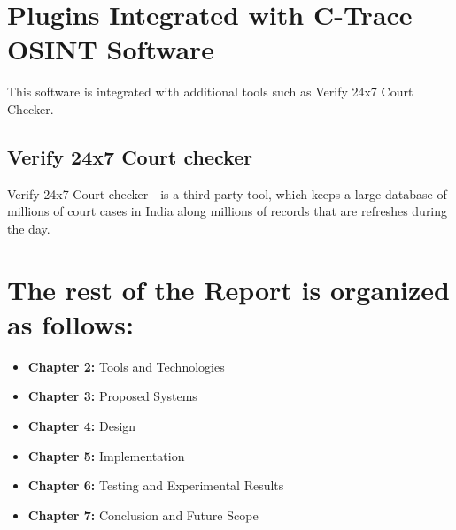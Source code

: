 \section{Plugins Integrated with C-Trace OSINT Software}\label{sec:plugins-integrated-with-c-trace-osint-software}

This software is integrated with additional tools such as Verify 24x7 Court Checker.
\subsection{Verify 24x7 Court checker}\label{subsec:verify-24x7-court-checker}

Verify 24x7 Court checker - is a third party tool, which keeps a large database of millions of court cases in India along millions of records that are refreshes during the day.

\section*{The rest of the Report is organized as follows:}
\begin{itemize}
    \item \textbf{Chapter 2:} Tools and Technologies
    \item \textbf{Chapter 3:} Proposed Systems
    \item \textbf{Chapter 4:} Design
    \item \textbf{Chapter 5:} Implementation
    \item \textbf{Chapter 6:} Testing and Experimental Results
    \item \textbf{Chapter 7:} Conclusion and Future Scope
\end{itemize}

\newpage


